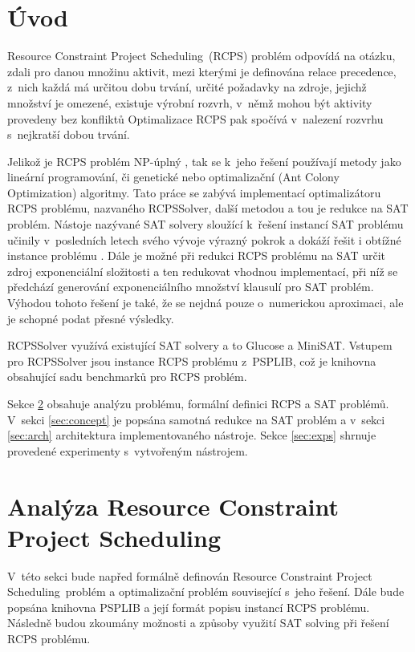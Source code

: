 \documentclass[a4paper, 12pt]{article}
\title{\rcps}
\author{Martin Hruška\\xhrusk16@stud.fit.vutbr.cz}
\date{}
\newcommand{\rcps}[0]{Resource Constraint Project Scheduling}
\begin{document}
\maketitle

\section{Úvod}
\label{sec:intro}
\rcps\ (RCPS) problém odpovídá na otázku, zdali pro danou množinu aktivit, mezi kterými je definována
relace precedence, z~nich každá má určitou dobu trvání, určité požadavky na zdroje, jejichž množství je omezené,
existuje výrobní rozvrh, v~němž mohou být aktivity provedeny bez konfliktů
Optimalizace RCPS pak spočívá v~nalezení rozvrhu s~nejkratší dobou trvání.

Jelikož je RCPS problém NP-úplný \cite{artigues:2007}, tak se k~jeho řešení používají metody jako
lineární programování, či genetické nebo optimalizační (Ant Colony Optimization) algoritmy.
Tato práce se zabývá implementací optimalizátoru RCPS problému, nazvaného RCPSSolver,
další metodou a tou je redukce na SAT problém.
Nástoje nazývané SAT solvery sloužící k~řešení instancí SAT problému učinily v~posledních letech
svého vývoje výrazný pokrok a dokáží řešit i obtížné instance problému \cite{www:minisat,www:glucose}.
Dále je možné při redukci RCPS problému na SAT určit zdroj exponenciální složitosti a ten
redukovat vhodnou implementací, při níž se předchází generování exponenciálního množství klausulí pro SAT problém.
Výhodou tohoto řešení je také, že se nejdná pouze o~numerickou aproximaci, ale je schopné podat přesné
výsledky.

RCPSSolver využívá existující SAT solvery a to Glucose a MiniSAT.
Vstupem pro RCPSSolver jsou instance RCPS problému z~PSPLIB, což je knihovna obsahující sadu benchmarků
pro RCPS problém.

Sekce \ref{sec:analysis} obsahuje analýzu problému, formální definici RCPS a SAT problémů.
V~sekci \ref{sec:concept} je popsána samotná redukce na SAT problém a v~sekci \ref{sec:arch}
architektura implementovaného nástroje.
Sekce \ref{sec:exps} shrnuje provedené experimenty s~vytvořeným nástrojem.

\section{Analýza \rcps}
\label{sec:analysis}
V~této sekci bude napřed formálně definován \rcps\ problém a optimalizační problém související s~jeho řešení.
Dále bude popsána knihovna PSPLIB a její formát popisu instancí RCPS problému.
Následně budou zkoumány možnosti a způsoby využití SAT solving při řešení RCPS problému.
\end{document}
